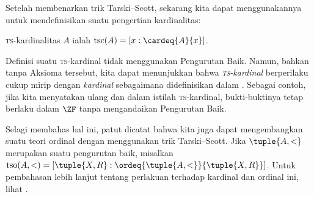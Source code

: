 \documentclass[../../../include/open-logic-section]{subfiles}
\begin{document}
Setelah membenarkan trik Tarski--Scott, sekarang kita dapat menggunakannya
untuk mendefinisikan suatu pengertian kardinalitas:

\begin{defn}
\textsc{ts}-kardinalitas $A$ ialah $\text{tsc}(A) = [x :
\cardeq{A}{x}]$.
\end{defn}

Definisi suatu \textsc{ts}-kardinal tidak menggunakan Pengurutan Baik.
Namun, bahkan tanpa Aksioma tersebut, kita dapat menunjukkan bahwa
\emph{\textsc{ts}-kardinal} berperilaku cukup mirip dengan \emph{kardinal}
sebagaimana didefinisikan dalam
. Sebagai contoh, jika
kita menyatakan ulang
 dan
 dalam istilah
\textsc{ts}-kardinal, bukti-buktinya tetap berlaku dalam $\ZF$ tanpa
mengandaikan Pengurutan Baik.

Selagi membahas hal ini, patut dicatat bahwa kita juga dapat mengembangkan
suatu teori ordinal dengan menggunakan trik Tarski--Scott. Jika
$\tuple{A, <}$ merupakan suatu pengurutan baik, misalkan
$\text{tso}(A, <) = [\tuple{X, R} :
\ordeq{\tuple{A, <}}{\tuple{X, R}}]$. Untuk pembahasan lebih lanjut tentang
perlakuan terhadap kardinal dan ordinal ini, lihat
\citet[bab~9--12]{Potter2004}.
\end{document}
